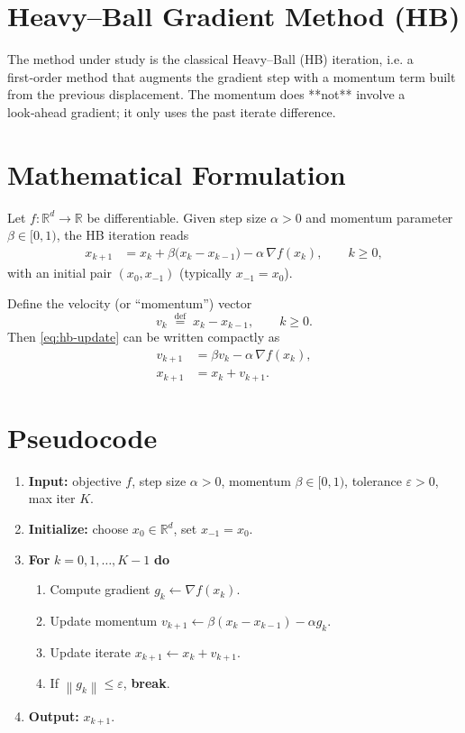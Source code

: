 \documentclass{article}
\newcommand{\norm}[1]{\left\|#1\right\|}
\newcommand{\grad}{\nabla}
\begin{document}
\section*{Heavy–Ball Gradient Method (HB)}

The method under study is the classical Heavy–Ball (HB) iteration, i.e. a first‑order method that augments the gradient step with a momentum term built from the previous displacement.  
The momentum does **not** involve a look‑ahead gradient; it only uses the past iterate difference.

\section*{Mathematical Formulation}
Let $f:\mathbb{R}^{d}\rightarrow\mathbb{R}$ be differentiable.  
Given step size $\alpha>0$ and momentum parameter $\beta\in[0,1)$, the HB iteration reads
\begin{align}
    x_{k+1}
    &= x_{k} + \beta\bigl(x_{k}-x_{k-1}\bigr) - \alpha\,\grad f(x_{k}),\qquad k\ge 0,
    \label{eq:hb-update}
\end{align}
with an initial pair $(x_{0},x_{-1})$ (typically $x_{-1}=x_{0}$).

Define the velocity (or “momentum”) vector
\[
    v_{k}\;\stackrel{\text{def}}{=}\;x_{k}-x_{k-1},\qquad k\ge 0 .
\]
Then \eqref{eq:hb-update} can be written compactly as
\begin{align}
    v_{k+1} &= \beta v_{k} - \alpha\,\grad f(x_{k}), \nonumber\\
    x_{k+1} &= x_{k}+v_{k+1}.
    \label{eq:hb-compact}
\end{align}

\section*{Pseudocode}
\begin{enumerate}[leftmargin=*,label=Step \arabic*:,wide=0pt]
\item \textbf{Input:} objective $f$, step size $\alpha>0$, momentum $\beta\in[0,1)$, tolerance $\varepsilon>0$, max iter $K$.
\item \textbf{Initialize:} choose $x_{0}\in\mathbb{R}^{d}$, set $x_{-1}=x_{0}$.
\item \textbf{For} $k=0,1,\dots,K-1$ \textbf{do}
\begin{enumerate}[label=\arabic*.]
\item Compute gradient $g_{k}\gets\grad f(x_{k})$.
\item Update momentum $v_{k+1}\gets \beta (x_{k}-x_{k-1}) - \alpha g_{k}$.
\item Update iterate $x_{k+1}\gets x_{k}+v_{k+1}$.
\item If $\norm{g_{k}}\le\varepsilon$, \textbf{break}.
\end{enumerate}
\item \textbf{Output:} $x_{k+1}$.
\end{enumerate}
\end{document}

